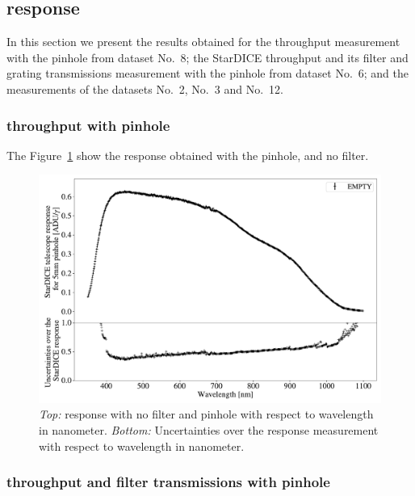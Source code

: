 \subsection{\SD response}

In this section we present the results obtained for the \SD throughput measurement with the \bpinhole pinhole from dataset No.~8; the StarDICE throughput and its filter and grating transmissions measurement with the \spinhole pinhole from dataset No.~6; and the measurements of the datasets No.~2, No.~3 and No.~12. 

\subsubsection{\SD throughput with \bpinhole pinhole}

The Figure~\ref{fig:stardice_5mm_response} show the \SD response obtained with the \bpinhole pinhole, and no filter.

\begin{figure}[h]
    \centering
    \includegraphics[width=\columnwidth]{fig/stardice_5mm_response.pdf}
    \caption{\textit{Top:} \SD response with no filter and \bpinhole pinhole with respect to wavelength in nanometer. \textit{Bottom:} Uncertainties over the \SD response measurement with respect to wavelength in nanometer.}
    \label{fig:stardice_5mm_response}
\end{figure}

\subsubsection{\SD throughput and filter transmissions with \spinhole pinhole}

